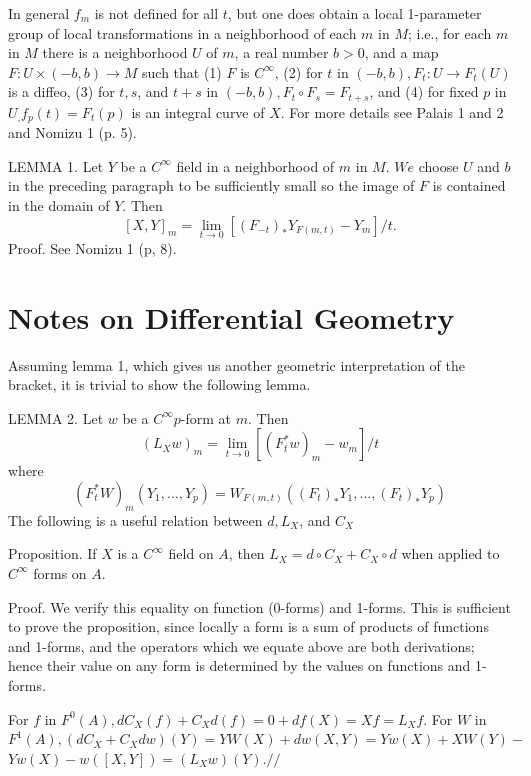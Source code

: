 \documentclass[10pt]{article}
\begin{document}
In general $f_{m}$ is not defined for all $t$, but one does obtain a local 1-parameter group of local transformations in a neighborhood of each $m$ in $M$; i.e., for each $m$ in $M$ there is a neighborhood $U$ of $m$, a real number $b>0$, and a map $F: U \times(-b, b) \rightarrow M$ such that (1) $F$ is $C^{\infty}$, (2) for $t$ in $(-b, b), F_{t}: U \rightarrow F_{t}(U)$ is a diffeo, (3) for $t, s$, and $t+s$ in $(-b, b), F_{t} \circ F_{s}=F_{t+s}$, and (4) for fixed $p$ in $U_{,} f_{p}(t)=F_{t}(p)$ is an integral curve of $X$. For more details see Palais 1 and 2 and Nomizu 1 (p. 5).

LEMMA 1. Let $Y$ be a $C^{\infty}$ field in a neighborhood of $m$ in $M$. $W e$ choose $U$ and $b$ in the preceding paragraph to be sufficiently small so the image of $F$ is contained in the domain of $Y$. Then
$$
[X, Y]_{m}=\lim _{t \rightarrow 0}\left[\left(F_{-t}\right)_{*} Y_{F(m, t)}-Y_{m}\right] / t .
$$
Proof. See Nomizu 1 (p, 8).

\section{Notes on Differential Geometry}
Assuming lemma 1, which gives us another geometric interpretation of the bracket, it is trivial to show the following lemma.

LEMMA 2. Let $w$ be a $C^{\infty} p$-form at $m .$ Then
$$
\left(L_{X} w\right)_{m}=\lim _{t \rightarrow 0}\left[\left(F_{t}^{*} w\right)_{m}-w_{m}\right] / t
$$
where
$$
\left(F_{t}^{*} W\right)_{m}\left(Y_{1}, \ldots, Y_{p}\right)=W_{F(m, t)}\left(\left(F_{t}\right)_{*} Y_{1}, \ldots,\left(F_{t}\right)_{*} Y_{p}\right)
$$
The following is a useful relation between $d, L_{X}$, and $C_{X}$

Proposition. If $X$ is a $C^{\infty}$ field on $A$, then $L_{X}=d \circ C_{X}+C_{X} \circ d$ when applied to $C^{\infty}$ forms on $A$.

Proof. We verify this equality on function (0-forms) and 1-forms. This is sufficient to prove the proposition, since locally a form is a sum of products of functions and 1-forms, and the operators which we equate above are both derivations; hence their value on any form is determined by the values on functions and 1-forms.

For $f$ in $F^{0}(A), d C_{X}(f)+C_{X} d(f)=0+d f(X)=X f=L_{X} f .$ For $W$ in $F^{1}(A),\left(d C_{X}+C_{X} d w\right)(Y)=Y W(X)+d w(X, Y)=Y w(X)+X W(Y)-$ $Y w(X)-w([X, Y])=\left(L_{X} w\right)(Y) . / /$
\end{document}
